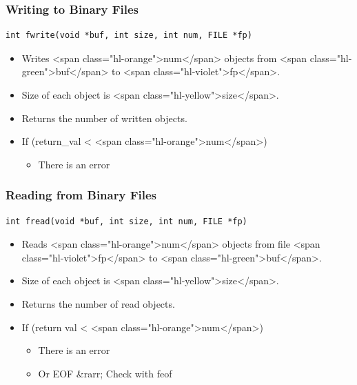 \documentclass{../c-lecture}
\begin{document}
\begin{frame}
  \frametitle{Writing to Binary Files}
  \begin{verbatim}
int fwrite(void *buf, int size, int num, FILE *fp)
  \end{verbatim}
  \begin{itemize}
    \item
      Writes <span class="hl-orange">num</span> objects from
      <span class="hl-green">buf</span> to <span class="hl-violet">fp</span>.

    \item Size of each object is <span class="hl-yellow">size</span>.
    \item Returns the number of written objects.
    \item If (return_val < <span class="hl-orange">num</span>)
    \begin{itemize}
      \item There is an error
    \end{itemize}
  \end{itemize}
\end{frame}

\begin{frame}
  \frametitle{Reading from Binary Files}
  \begin{verbatim}
int fread(void *buf, int size, int num, FILE *fp)
  \end{verbatim}
  \begin{itemize}
    \item
      Reads <span class="hl-orange">num</span> objects from file
      <span class="hl-violet">fp</span> to <span class="hl-green">buf</span>.

    \item Size of each object is <span class="hl-yellow">size</span>.
    \item Returns the number of read objects.
    \item If (return val < <span class="hl-orange">num</span>)
    \begin{itemize}
      \item There is an error
      \item Or EOF &rarr; Check with feof
    \end{itemize}
  \end{itemize}
\end{frame}
\end{document}
